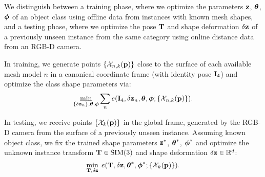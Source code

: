 We distinguish between a training phase, where we optimize the parameters $\mathbf{z}$, $\boldsymbol{\theta}$, $\boldsymbol{\phi}$ of an object class using offline data from instances with known mesh shapes, and a testing phase, where we optimize the pose $\mathbf{T}$ and shape deformation $\delta \mathbf{z}$ of a previously unseen instance from the same category using online distance data from an RGB-D camera.

In training, we generate points $\left\{{\cal X}_{n,k}(\mathbf{p})\right\}$ close to the surface of each available mesh model $n$ in a canonical coordinate frame (with identity pose $\mathbf{I}_4$) and optimize the class shape parameters via:
%
\begin{equation}
\min_{\left\{\delta \mathbf{z}_n\right\}, \boldsymbol{\theta}, \boldsymbol{\phi}} \sum_n e(\mathbf{I}_4,\delta \mathbf{z}_n, \boldsymbol{\theta}, \boldsymbol{\phi} ; \left\{{\cal X}_{n,k}(\mathbf{p})\right\}).
\end{equation}


In testing, we receive points $\left\{{\cal X}_{k}(\mathbf{p})\right\}$ in the global frame, generated by the RGB-D camera from the surface of a previously unseen instance. Assuming known object class, we fix the trained shape parameters $\mathbf{z}^*$, $\boldsymbol{\theta}^*$, $\boldsymbol{\phi}^*$ and optimize the unknown instance transform $\mathbf{T} \in \text{SIM}(3)$ and shape deformation $\delta \mathbf{z} \in \mathbb{R}^d$:
%
\begin{equation} \label{eq:test_optimization}
\min_{\mathbf{T}, \delta \mathbf{z}} \; e(\mathbf{T},\delta \mathbf{z}, \boldsymbol{\theta}^*, \boldsymbol{\phi}^* ; \left\{{\cal X}_k(\mathbf{p})\right\}).
\end{equation}


















